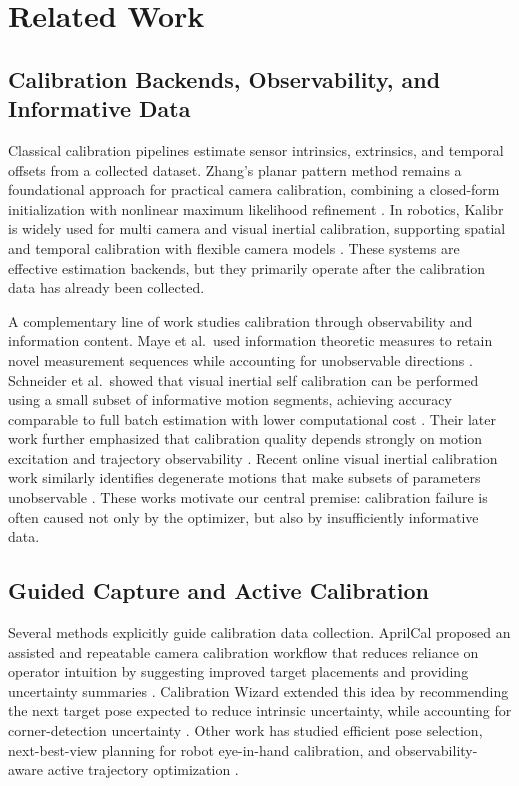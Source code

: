 \documentclass[letterpaper, 9
 pt, conference]{ieeeconf}
\begin{document}
\section{Related Work}

\subsection{Calibration Backends, Observability, and Informative Data}
Classical calibration pipelines estimate sensor intrinsics, extrinsics, and
temporal offsets from a collected dataset. Zhang's planar pattern method
remains a foundational approach for practical camera calibration, combining a
closed-form initialization with nonlinear maximum likelihood refinement
\citep{zhang2000flexible}. In robotics, Kalibr is widely used for
multi camera and visual inertial calibration, supporting spatial and temporal
calibration with flexible camera models
\citep{furgale2013kalibr,kalibr_toolbox}. These systems are effective
estimation backends, but they primarily operate after the calibration data has
already been collected.

A complementary line of work studies calibration through observability and
information content. Maye et al.\ used information theoretic measures to retain
novel measurement sequences while accounting for unobservable directions
\citep{maye2013self}. Schneider et al.\ showed that visual inertial
self calibration can be performed using a small subset of informative motion
segments, achieving accuracy comparable to full batch estimation with lower
computational cost \citep{schneider2017informative}. Their later work further
emphasized that calibration quality depends strongly on motion excitation and
trajectory observability \citep{schneider2019observability}. Recent online
visual inertial calibration work similarly identifies degenerate motions that
make subsets of parameters unobservable \citep{yang2023online}. These works
motivate our central premise: calibration failure is often caused not only by
the optimizer, but also by insufficiently informative data.

\subsection{Guided Capture and Active Calibration}
Several methods explicitly guide calibration data collection. AprilCal proposed
an assisted and repeatable camera calibration workflow that reduces reliance on
operator intuition by suggesting improved target placements and providing
uncertainty summaries \citep{richardson2013aprilcal}. Calibration Wizard
extended this idea by recommending the next target pose expected to reduce
intrinsic uncertainty, while accounting for corner-detection uncertainty
\citep{peng2019calibration}. Other work has studied efficient pose selection,
next-best-view planning for robot eye-in-hand calibration, and
observability-aware active trajectory optimization
\citep{rojtberg2018efficient,yang2023nbv,wang2025active}.
\end{document}

